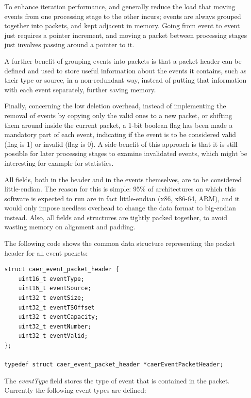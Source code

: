 \documentclass[a4paper,12pt]{report}
\begin{document}
To enhance iteration performance, and generally reduce the load that moving events from one processing stage to the other incurs; events are always grouped together into packets, and kept adjacent in memory. Going from event to event just requires a pointer increment, and moving a packet between processing stages just involves passing around a pointer to it.

A further benefit of grouping events into packets is that a packet header can be defined and used to store useful information about the events it contains, such as their type or source, in a non-redundant way, instead of putting that information with each event separately, further saving memory.

Finally, concerning the low deletion overhead, instead of implementing the removal of events by copying only the valid ones to a new packet, or shifting them around inside the current packet, a 1-bit boolean flag has been made a mandatory part of each event, indicating if the event is to be considered valid (flag is 1) or invalid (flag is 0). A side-benefit of this approach is that it is still possible for later processing stages to examine invalidated events, which might be interesting for example for statistics.

All fields, both in the header and in the events themselves, are to be considered little-endian. The reason for this is simple: 95\% of architectures on which this software is expected to run are in fact little-endian (x86, x86-64, ARM), and it would only impose needless overhead to change the data format to big-endian instead.
Also, all fields and structures are tightly packed together, to avoid wasting memory on alignment and padding.

The following code shows the common data structure representing the packet header for all event packets:

\begin{lstlisting}
struct caer_event_packet_header {
    uint16_t eventType;
    uint16_t eventSource;
    uint32_t eventSize;
    uint32_t eventTSOffset
    uint32_t eventCapacity;
    uint32_t eventNumber;
    uint32_t eventValid;
};

typedef struct caer_event_packet_header *caerEventPacketHeader;
\end{lstlisting}

The \emph{eventType} field stores the type of event that is contained in the packet.
Currently the following event types are defined:
\end{document}
